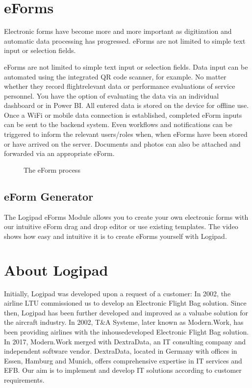 \documentclass[a4paper,12pt,english]{sphinxmanual}
\begin{document}
\pagestyle{normal}
\label{\detokenize{index::doc}}



\chapter{eForms}
\label{\detokenize{eForms:eforms}}\label{\detokenize{eForms::doc}}
Electronic forms have become more and more important as digitization and automatic data processing has progressed. eForms are not limited to simple text input or selection fields.

eForms are not limited to simple text input or selection fields. Data input can be automated using the integrated QR code scanner, for example. No matter whether they record flight\sphinxhyphen{}relevant data or performance evaluations of service personnel. You have the option of evaluating the data via an individual dashboard or in Power BI. All entered data is stored on the device for offline use. Once a Wi\sphinxhyphen{}Fi or mobile data connection is established, completed eForm inputs can be sent to the backend system. Even workflows and notifications can be triggered to inform the relevant users/roles when, when eForms have been stored or have arrived on the server. Documents and photos can also be attached and forwarded via an appropriate eForm.

\begin{figure}[htbp]
\centering
\capstart

\noindent{}
\caption{The eForm process}\label{\detokenize{eForms:id1}}\end{figure}


\section{eForm Generator}
\label{\detokenize{eForms:eform-generator}}
The Logipad eForms Module allows you to create your own electronic forms with our intuitive eForm drag and drop editor or use existing templates. The video shows how easy and intuitive it is to create eForms yourself with Logipad.


\chapter{About Logipad}
\label{\detokenize{about:about-logipad}}\label{\detokenize{about::doc}}
Initially, Logipad was developed upon a request of a customer: In 2002, the airline LTU commissioned us to develop an Electronic Flight Bag solution. Since then, Logipad has been further developed and improved as a valuabe solution for the aircraft industry.
In 2002, T\&A Systeme, later known as Modern.Work, has been providing airlines with the inhouse\sphinxhyphen{}developed Electronic Flight Bag solution. In 2017, Modern.Work merged with DextraData, an IT consulting company and independent software vendor.
DextraData, located in Germany with offices in Essen, Hamburg and Munich, offers comprehensive expertise in IT services and EFB. Our aim is to implement and develop IT solutions according to customer requirements.
\end{document}
